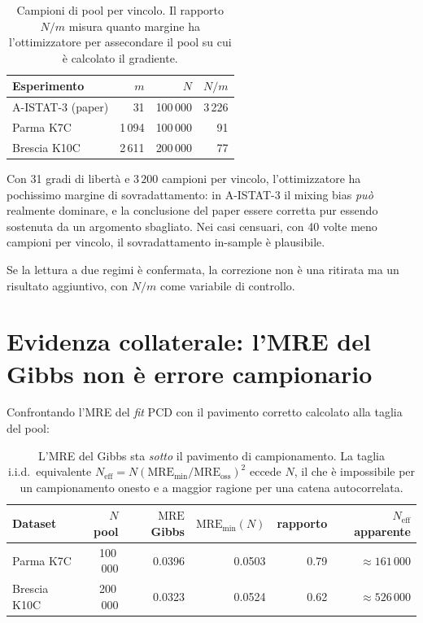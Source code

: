 \documentclass[11pt,a4paper]{article}
\newcommand{\MRE}{\mathrm{MRE}}
\begin{document}
\begin{table}[h]
\centering
\caption{Campioni di pool per vincolo. Il rapporto $N/m$ misura quanto
margine ha l'ottimizzatore per assecondare il pool su cui è calcolato
il gradiente.}
\begin{tabular}{lrrr}
\toprule
Esperimento & $m$ & $N$ & $N/m$ \\
\midrule
A-ISTAT-3 (paper) &    31 & 100\,000 & 3\,226 \\
Parma K7C         & 1\,094 & 100\,000 &     91 \\
Brescia K10C      & 2\,611 & 200\,000 &     77 \\
\bottomrule
\end{tabular}
\label{tab:regimi}
\end{table}

Con 31 gradi di libertà e $3\,200$ campioni per vincolo,
l'ottimizzatore ha pochissimo margine di sovradattamento: in
A-ISTAT-3 il mixing bias \emph{può} realmente dominare, e la
conclusione del paper essere corretta pur essendo sostenuta da un
argomento sbagliato. Nei casi censuari, con 40 volte meno campioni per
vincolo, il sovradattamento in-sample è plausibile.

Se la lettura a due regimi è confermata, la correzione non è una
ritirata ma un risultato aggiuntivo, con $N/m$ come variabile di
controllo.

\section{Evidenza collaterale: l'MRE del Gibbs non è errore campionario}

Confrontando l'MRE del \emph{fit} PCD con il pavimento corretto
calcolato alla taglia del pool:

\begin{table}[h]
\centering
\caption{L'MRE del Gibbs sta \emph{sotto} il pavimento di
campionamento. La taglia i.i.d.\ equivalente
$N_{\text{eff}}=N(\MRE_{\min}/\MRE_{\text{oss}})^2$ eccede $N$, il che
è impossibile per un campionamento onesto e a maggior ragione per una
catena autocorrelata.}
\begin{tabular}{lrrrrr}
\toprule
Dataset & $N$ pool & $\MRE$ Gibbs & $\MRE_{\min}(N)$ & rapporto
        & $N_{\text{eff}}$ apparente \\
\midrule
Parma K7C    & 100\,000 & 0.0396 & 0.0503 & 0.79 & $\approx161\,000$ \\
Brescia K10C & 200\,000 & 0.0323 & 0.0524 & 0.62 & $\approx526\,000$ \\
\bottomrule
\end{tabular}
\end{table}
\end{document}
